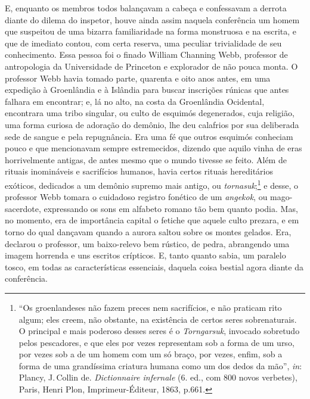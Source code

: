 E, enquanto os membros todos balançavam a cabeça e confessavam a
derrota diante do dilema do inspetor, houve ainda assim naquela
conferência um homem que suspeitou de uma bizarra familiaridade na forma
monstruosa e na escrita, e que de imediato contou, com certa reserva,
uma peculiar trivialidade de seu conhecimento. Essa pessoa foi o finado
William Channing Webb, professor de antropologia da Universidade de
Princeton e explorador de não pouca monta. O professor Webb havia
tomado parte, quarenta e oito anos antes, em uma expedição à Groenlândia
e à Islândia para buscar inscrições rúnicas que antes falhara em
encontrar; e, lá no alto, na costa da Groenlândia Ocidental, encontrara
uma tribo singular, ou culto de esquimós degenerados, cuja religião, uma
forma curiosa de adoração do demônio, lhe deu calafrios por sua
deliberada sede de sangue e pela repugnância. Era uma fé que outros esquimós
conheciam pouco e que mencionavam sempre estremecidos, dizendo que
aquilo vinha de eras horrivelmente antigas, de antes mesmo que o mundo
tivesse se feito. Além de rituais inomináveis e sacrifícios humanos, havia
certos rituais hereditários exóticos, dedicados a um demônio supremo
mais antigo, ou \emph{tornasuk};\footnote{``Os groenlandeses não fazem
  preces nem sacrifícios, e não praticam rito algum; eles creem, não
  obstante, na existência de certos seres sobrenaturais. O principal e
  mais poderoso desses seres é o \emph{Torngarsuk}, invocado sobretudo
  pelos pescadores, e que eles por vezes representam sob a forma de um
  urso, por vezes sob a de um homem com um só braço, por vezes, enfim,
  sob a forma de uma grandíssima criatura humana como um dos dedos da
  mão'', \emph{in}: Plancy, J.\,Collin de. \emph{Dictionnaire infernale}
  (6. ed., com 800 novos verbetes), Paris, Henri
  Plon, Imprimeur-Éditeur, 1863, p.661.} e desse, o professor Webb
tomara o cuidadoso registro fonético de um \emph{angekok}, ou
mago-sacerdote, expressando os sons em alfabeto romano tão bem quanto
podia. Mas, no momento, era de importância capital o fetiche que
aquele culto prezara, e em torno do qual dançavam quando a aurora saltou
sobre os montes gelados. Era, declarou o professor, um baixo-relevo bem
rústico, de pedra, abrangendo uma imagem horrenda e uns escritos
crípticos. E, tanto quanto sabia, um paralelo tosco, em todas as
características essenciais, daquela coisa bestial agora diante da
conferência.


